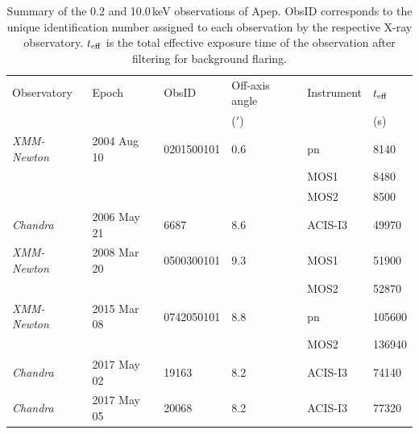 \documentclass[preprint,times]{aastex61}
\newcommand{\xmm}{\emph{XMM-Newton}}
\newcommand{\chan}{\emph{Chandra}}
\begin{document}
\begin{table}
\renewcommand\tablename{Supplementary Information Table}
  \small
  \caption{\label{tab:Xrayobs} Summary of the 0.2 and 10.0\,keV observations of Apep. ObsID corresponds to the unique identification number assigned to each observation by the respective X-ray observatory. $t_{\rm{eff}}$ is the total effective exposure time of the observation after filtering for background flaring.}
  \begin{center}
    \begin{tabular}{llllll}
    \hline
Observatory & Epoch & ObsID & Off-axis angle & Instrument & $t_{\rm{eff}}$   \\
            &       &       & ($'$)&           & (s)  \\
    \hline    
    \hline    
\xmm  & 2004 Aug 10 & 0201500101 & 0.6 & pn   & 8140 \\
    &           &            &     & MOS1 & 8480 \\
    &             &            &     & MOS2 & 8500 \\
\chan & 2006 May 21 & 6687       & 8.6 & ACIS-I3 & 49970 \\
\xmm  & 2008 Mar 20 & 0500300101 & 9.3 & MOS1 & 51900 \\
    &             &            &     & MOS2 & 52870 \\
\xmm  & 2015 Mar 08 & 0742050101 & 8.8 & pn   & 105600  \\
      &             &            &     & MOS2 & 136940  \\
\chan  & 2017 May 02 & 19163 & 8.2 & ACIS-I3   & 74140 \\
\chan  & 2017 May 05 & 20068  & 8.2 & ACIS-I3   & 77320  \\
    \hline\end{tabular}
\end{center}
\end{table}
\end{document}
